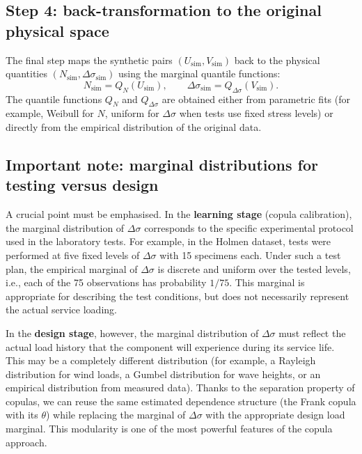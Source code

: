 \subsection{Step 4: back-transformation to the original physical space}

The final step maps the synthetic pairs \((U_{\text{sim}}, V_{\text{sim}})\) back to the physical quantities \((N_{\text{sim}}, \Delta\sigma_{\text{sim}})\) using the marginal quantile functions:
\begin{equation}
N_{\text{sim}} = Q_N(U_{\text{sim}}), \qquad \Delta\sigma_{\text{sim}} = Q_{\Delta\sigma}(V_{\text{sim}}).
\label{eq:retransform}
\end{equation}
The quantile functions \(Q_N\) and \(Q_{\Delta\sigma}\) are obtained either from parametric fits (for example, Weibull for \(N\), uniform for \(\Delta\sigma\) when tests use fixed stress levels) or directly from the empirical distribution of the original data.

\subsection{Important note: marginal distributions for testing versus design}

A crucial point must be emphasised. In the \textbf{learning stage} (copula calibration), the marginal distribution of \(\Delta\sigma\) corresponds to the specific experimental protocol used in the laboratory tests. For example, in the Holmen dataset, tests were performed at five fixed levels of \(\Delta\sigma\) with 15 specimens each. Under such a test plan, the empirical marginal of \(\Delta\sigma\) is discrete and uniform over the tested levels, i.e., each of the 75 observations has probability \(1/75\). This marginal is appropriate for describing the test conditions, but does not necessarily represent the actual service loading.

In the \textbf{design stage}, however, the marginal distribution of \(\Delta\sigma\) must reflect the actual load history that the component will experience during its service life. This may be a completely different distribution (for example, a Rayleigh distribution for wind loads, a Gumbel distribution for wave heights, or an empirical distribution from measured data). Thanks to the separation property of copulas, we can reuse the same estimated dependence structure (the Frank copula with its \(\theta\)) while replacing the marginal of \(\Delta\sigma\) with the appropriate design load marginal. This modularity is one of the most powerful features of the copula approach.

